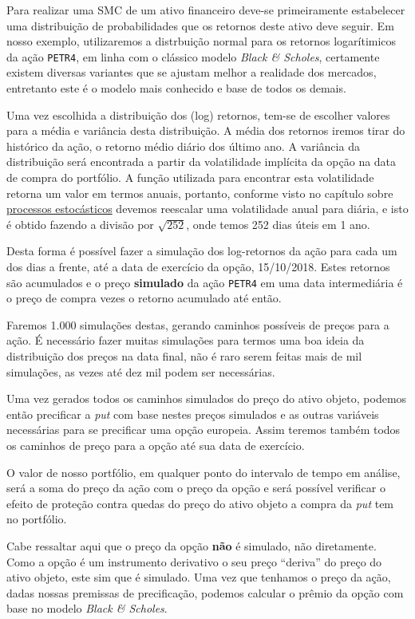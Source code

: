 \documentclass[]{book}
\theoremstyle{definition}
\theoremstyle{definition}
\theoremstyle{definition}
\theoremstyle{remark}
\begin{document}
Para realizar uma SMC de um ativo financeiro deve-se primeiramente
estabelecer uma distribuição de probabilidades que os retornos deste
ativo deve seguir. Em nosso exemplo, utilizaremos a distrbuição normal
para os retornos logarítimicos da ação \texttt{PETR4}, em linha com o
clássico modelo \emph{Black \& Scholes}, certamente existem diversas
variantes que se ajustam melhor a realidade dos mercados, entretanto
este é o modelo mais conhecido e base de todos os demais.

Uma vez escolhida a distribuição dos (log) retornos, tem-se de escolher
valores para a média e variância desta distribuição. A média dos
retornos iremos tirar do histórico da ação, o retorno médio diário dos
último ano. A variância da distribuição será encontrada a partir da
volatilidade implícita da opção na data de compra do portfólio. A função
utilizada para encontrar esta volatilidade retorna um valor em termos
anuais, portanto, conforme visto no capítulo sobre
\protect\hyperlink{processos-estocasticos}{processos estocásticos}
devemos reescalar uma volatilidade anual para diária, e isto é obtido
fazendo a divisão por \(\sqrt{252}\), onde temos 252 dias úteis em 1
ano.

Desta forma é possível fazer a simulação dos log-retornos da ação para
cada um dos dias a frente, até a data de exercício da opção, 15/10/2018.
Estes retornos são acumulados e o preço \textbf{simulado} da ação
\texttt{PETR4} em uma data intermediária é o preço de compra vezes o
retorno acumulado até então.

Faremos 1.000 simulações destas, gerando caminhos possíveis de preços
para a ação. É necessário fazer muitas simulações para termos uma boa
ideia da distribuição dos preços na data final, não é raro serem feitas
mais de mil simulações, as vezes até dez mil podem ser necessárias.

Uma vez gerados todos os caminhos simulados do preço do ativo objeto,
podemos então precificar a \emph{put} com base nestes preços simulados e
as outras variáveis necessárias para se precificar uma opção europeia.
Assim teremos também todos os caminhos de preço para a opção até sua
data de exercício.

O valor de nosso portfólio, em qualquer ponto do intervalo de tempo em
análise, será a soma do preço da ação com o preço da opção e será
possível verificar o efeito de proteção contra quedas do preço do ativo
objeto a compra da \emph{put} tem no portfólio.

Cabe ressaltar aqui que o preço da opção \textbf{não} é simulado, não
diretamente. Como a opção é um instrumento derivativo o seu preço
``deriva'' do preço do ativo objeto, este sim que é simulado. Uma vez
que tenhamos o preço da ação, dadas nossas premissas de precificação,
podemos calcular o prêmio da opção com base no modelo \emph{Black \&
Scholes}.
\end{document}
